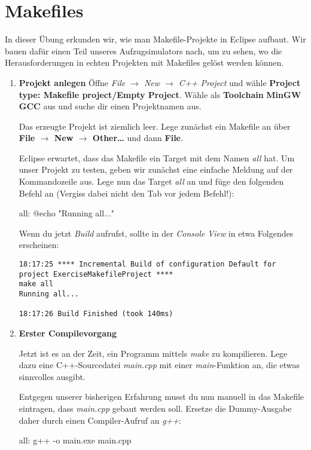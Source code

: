 \section{Makefiles}

In dieser Übung erkunden wir, wie man Makefile-Projekte in Eclipse aufbaut.
Wir bauen dafür einen Teil unseres Aufzugsimulators nach, um zu sehen, wo die Herausforderungen in echten Projekten mit Makefiles gelöst werden können.

\begin{enumerate}
\item\textbf{Projekt anlegen}
Öffne \emph{File $\to$ New $\to$ C++ Project} und wähle \textbf{Project type: Makefile project/Empty Project}.
Wähle als \textbf{Toolchain} \textbf{MinGW GCC} aus und suche dir einen Projektnamen aus.

Das erzeugte Projekt ist ziemlich leer.
Lege zunächst ein Makefile an über \textbf{File $\to$ New $\to$ Other\dots} und dann \textbf{File}.

Eclipse erwartet, dass das Makefile ein Target mit dem Namen \emph{all} hat.
Um unser Projekt zu testen, geben wir zunächst eine einfache Meldung auf der Kommandozeile aus.
Lege nun das Target \emph{all} an und füge den folgenden Befehl an (Vergiss dabei nicht den Tab vor jedem Befehl!):
\begin{lstmake}
all:
	@echo "Running all..."
\end{lstmake}

Wenn du jetzt \emph{Build} aufrufst, sollte in der \emph{Console View} in etwa Folgendes erscheinen:
\begin{verbatim}
18:17:25 **** Incremental Build of configuration Default for project ExerciseMakefileProject ****
make all
Running all...

18:17:26 Build Finished (took 140ms)
\end{verbatim}

\item\textbf{Erster Compilevorgang}

Jetzt ist es an der Zeit, ein Programm mittels \emph{make} zu kompilieren.
Lege dazu eine C++-Sourcedatei \emph{main.cpp} mit einer \emph{main}-Funktion an, die etwas sinnvolles ausgibt.

Entgegen unserer bisherigen Erfahrung musst du nun manuell in das Makefile eintragen, dass \emph{main.cpp} gebaut werden soll.
Ersetze die Dummy-Ausgabe daher durch einen Compiler-Aufruf an \emph{g++}:
\begin{lstmake}
all:
	g++ -o main.exe main.cpp
\end{lstmake}


\end{enumerate}

